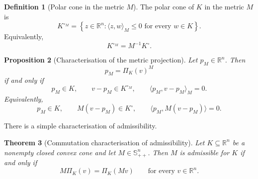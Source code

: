 \documentclass[a4paper,11pt]{book}
\theoremstyle{plain}
\newtheorem{theorem}{Theorem}[chapter]
\newtheorem{proposition}[theorem]{Proposition}
\theoremstyle{definition}
\newtheorem{definition}[theorem]{Definition}
\theoremstyle{remark}
\numberwithin{equation}{chapter}
\numberwithin{algorithm}{chapter}
\newcommand{\proj}[2]{\Pi_{#2}\!\left(#1\right)}
\begin{document}
	\begin{definition}[Polar cone in the metric $M$]
		The polar cone of $K$ in the metric $M$ is
		\[
		K^{\circ_M}
		=
		\left\{
		z\in\mathbb R^n:
		\langle z,w\rangle_M\leq0
		\text{ for every }w\in K
		\right\}.
		\]
		Equivalently,
		\[
		K^{\circ_M}=M^{-1}K^\circ.
		\]
	\end{definition}
	
	\begin{proposition}[Characterisation of the metric projection]
		Let $p_M\in\mathbb R^n$. Then
		\[
		p_M=\proj{v}{K}^{M}
		\]
		if and only if
		\[
		p_M\in K,
		\qquad
		v-p_M\in K^{\circ_M},
		\qquad
		\langle p_M,v-p_M\rangle_M=0.
		\]
		Equivalently,
		\[
		p_M\in K,
		\qquad
		M(v-p_M)\in K^\circ,
		\qquad
		\langle p_M,M(v-p_M)\rangle=0.
		\]
	\end{proposition}
	
	There is a simple characterisation of admissibility.
	\begin{theorem}[Commutation characterisation of admissibility]
		Let $K\subseteq\mathbb R^n$ be a nonempty closed convex cone and let
		$M\in\mathbb S_{++}^n$. Then $M$ is admissible for $K$ if and only if
		\[
		M\proj{v}{K}=\proj{Mv}{K}
		\qquad\text{for every }v\in\mathbb R^n.
		\]
	\end{theorem}
	
\end{document}
